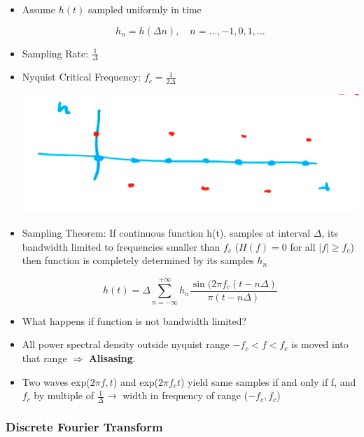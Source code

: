 \begin{itemize}
    \item Assume $h(t)$ sampled uniformly in time

    \[ h_n = h(\Delta n), \quad n=\ldots,-1,0,1,\ldots\]

    \item Sampling Rate: $\frac{1}{\Delta}$

    \item Nyquist Critical Frequency: $f_c = \frac{1}{2\Delta}$

    \begin{center}
        \includegraphics[width = 0.5 \linewidth]{Images/nyquist_aliasing.png}
    \end{center}

    \item Sampling Theorem: If continuous function h(t), samples at interval $\Delta$, its bandwidth limited to frequencies smaller than $f_c$ ($H(f) = 0$ for all $|f| \ge f_c$) then function is completely determined by its samples $h_n$

    \[ h(t) = \Delta \sum_{n=-\infty}^{+\infty} h_n \frac{\sin(2\pi f_c(t-n\Delta)}{\pi(t-n\Delta)}\]

    \item What happens if function is not bandwidth limited?

    \item All power spectral density outside nyquist range $-f_c < f < f_c$ is moved into that range $\Rightarrow$ \textbf{Alisasing}.

    \item Two waves exp($2\pi f,t$) and exp($2\pi f_c t$) yield same samples if and only if f, and $f_c$ by multiple of $\frac{1}{\Delta} \rightarrow$ width in frequency of range ($-f_c,f_c$)
\end{itemize}

\subsubsection{Discrete Fourier Transform}

